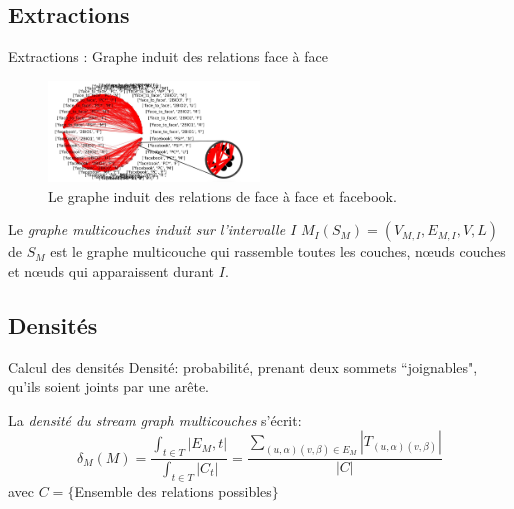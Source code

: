 \documentclass[15pt]{beamer}
\def \stgm {stream graph multicouches}
\begin{document}
\subsection{Extractions}
\begin{frame}{Extractions : Graphe induit des relations face à face}

\begin{figure}
    \centering
    \includegraphics[width=0.5\textwidth]{img/induitzoom.JPG}
    \caption{Le graphe induit des relations de face à face et facebook.}
    \label{fig:my_label}
\end{figure}
    Le {\em graphe multicouches induit sur l'intervalle $I$} $M_I(S_M) = (V_{M,I}, E_{M,I}, V,L)$ de $S_M$ est le graphe multicouche qui rassemble toutes les couches, n\oe{}uds couches et n\oe{}uds qui apparaissent durant $I$.
\end{frame}

\subsection{Densités}

\begin{frame}{Calcul des densités}
    Densité: probabilité, prenant deux sommets ``joignables", qu'ils soient joints par une arête.
    
    \vspace{1cm}
    
    La {\em densité du \stgm{}} s'écrit: 
	\[
		\delta_M (M) 
		= \frac{\int_{t\in T}|E_M,t|}{\int_{t\in T}|C_t|} 
		= \frac{\sum_{(u,\alpha)(v,\beta) \in E_M}|T_{(u,\alpha)(v,\beta)}|}{|C|}
	\]	
	avec $C=\{$Ensemble des relations possibles$\}$

\end{frame}
\end{document}
